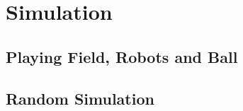
\section{Simulation}

\subsection{Playing Field, Robots and Ball}

\subsection{Random Simulation}

